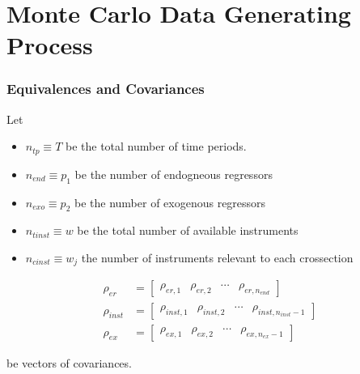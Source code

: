 \documentclass[9pt]{beamer}
\begin{document}
\section{Monte Carlo Data Generating Process}
\begin{frame} 
\frametitle{Equivalences and Covariances} 

Let 
\begin{itemize} \addtolength{\itemsep}{\baselineskip}
     \item $n_{tp} \equiv T$ be the total number of time periods.
     \item $n_{end} \equiv p_1$ be the number of endogneous regressors
     \item  $n_{exo} \equiv p_2$ be the number of exogenous regressors  
     \item  $n_{tinst} \equiv w$ be the total number of available instruments
     \item $ n_{cinst} \equiv w_j$  the number of instruments relevant to each crossection
 \end{itemize}   
    
    
$$
\begin{align*} 
\rho_{er} &= \begin{bmatrix} \rho_{er,1} & \rho_{er,2} & \cdots & \rho_{er,n_{end}} \end{bmatrix} \\[10pt]
\rho_{inst} &= \begin{bmatrix} \rho_{inst,1} & \rho_{inst,2} & \cdots & \rho_{inst,n_{inst}-1} \end{bmatrix}\\[10pt]
\rho_{ex} &= \begin{bmatrix} \rho_{ex,1} & \rho_{ex,2} & \cdots & \rho_{ex,n_{ex}-1} \end{bmatrix}  
\end{align*}
$$


be vectors of covariances.

\end{frame}
\end{document}
